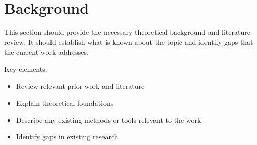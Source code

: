 \section{Background}

This section should provide the necessary theoretical background and literature review. It should establish what is known about the topic and identify gaps that the current work addresses.

Key elements:
\begin{itemize}
	\item Review relevant prior work and literature
	\item Explain theoretical foundations
	\item Describe any existing methods or tools relevant to the work
	\item Identify gaps in existing research
\end{itemize}